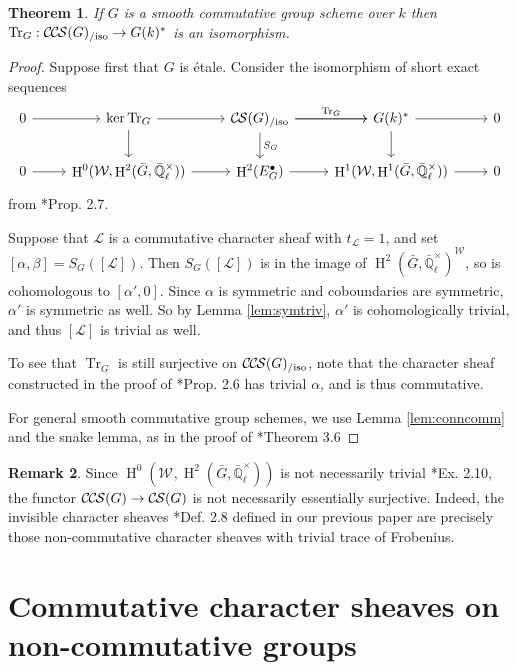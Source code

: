 \documentclass[10pt]{amsart}
\theoremstyle{plain}
\newtheorem{theorem}{Theorem}[section]
\theoremstyle{definition}
\newtheorem{remark}[theorem]{Remark}
\newcommand{\EE}{\mathbb{\bar Q}_\ell}
\newcommand{\Fq}{k}
\newcommand{\EEx}{\EE^\times}
\newcommand{\Weil}[1]{\mathcal{W}_{#1}}
\DeclareMathOperator{\Hh}{H}
\newcommand{\trFrob}[1]{t_{#1}}
\DeclareMathOperator{\Tr}{Tr}
\newcommand{\TrFrob}[1]{\Tr_{#1}}
\newcommand{\cs}[1]{{\mathcal{#1}}}
\newcommand{\CS}{{\mathcal{C\hskip-0.8pt S}}}
\newcommand{\CCS}{{\mathcal{C\hskip-.8pt C\hskip-0.8pt S}}}
\newcommand{\CSiso}[1]{\CS(#1)_{/\text{iso}}}
\newcommand{\CCSiso}[1]{\CCS(#1)_{/\text{iso}}}
\newcommand{\bG}{\bar{G}}
\begin{document}
\begin{theorem} \label{thm:trfrobiso}
If $G$ is a smooth commutative group scheme over $\Fq$ then $\TrFrob{G} : \CCSiso{G} \to G(\Fq)^*$ is an isomorphism.
\end{theorem}

\begin{proof}
Suppose first that $G$ is \'etale.  Consider the isomorphism of short exact sequences
\[
\begin{tikzcd}
 0 \arrow{r} & \ker \TrFrob{G} \arrow{d} \arrow{r} & \CSiso{G}\arrow{d}{S_G} \arrow{r}{\TrFrob{G}} \arrow{r} & G(\Fq)^* \arrow{d} \arrow{r} & 0\\
  0 \arrow{r} & \Hh^0(\Weil{},\Hh^2(\bG,\EEx)) \arrow{r} & \Hh^2(E^\bullet_G) \arrow{r} & \Hh^1(\Weil{},\Hh^1(\bG,\EEx)) \arrow{r} & 0
 \end{tikzcd}
 \]
from \cite{cunningham-roe:13a}*{Prop. 2.7}.

Suppose that $\cs{L}$ is a commutative character sheaf with $\trFrob{\cs{L}} = 1$, and set $[\alpha, \beta] = S_G([\cs{L}])$.
Then $S_G([\cs{L}])$ is in the image of $\Hh^2(\bG, \EEx)^\Weil{}$, so is cohomologous to
$[\alpha', 0]$.  Since $\alpha$ is symmetric and coboundaries are symmetric, $\alpha'$ is symmetric as well.
So by Lemma \ref{lem:symtriv}, $\alpha'$ is cohomologically trivial, and thus $[\cs{L}]$ is trivial as well.

To see that $\TrFrob{G}$ is still surjective on $\CCSiso{G}$, note that the character sheaf constructed in the proof of
\cite{cunningham-roe:13a}*{Prop. 2.6} has trivial $\alpha$, and is thus commutative.

For general smooth commutative group schemes, we use Lemma \ref{lem:conncomm} and the snake lemma, as in the proof of
\cite{cunningham-roe:13a}*{Theorem 3.6}
\end{proof}

\begin{remark}
Since $\Hh^0(\Weil{},\Hh^2(\bG,\EEx))$ is not necessarily trivial \cite{cunningham-roe:13a}*{Ex. 2.10}, the functor
$\CCS(G) \to \CS(G)$ is not necessarily essentially surjective.  Indeed, the invisible character sheaves \cite{cunningham-roe:13a}*{Def. 2.8}
defined in our previous paper are precisely those non-commutative character sheaves with trivial trace of Frobenius.
\end{remark}

\section{Commutative character sheaves on non-commutative groups}\label{sec:noncom}
\end{document}

